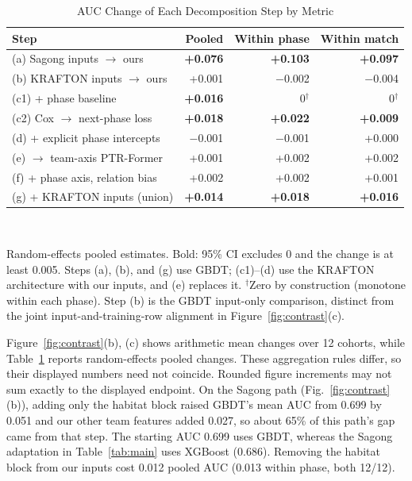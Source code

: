 \documentclass[sigconf,anonymous,nonacm]{acmart}
\begin{document}
\begin{table}[t]
\centering
\caption{AUC Change of Each Decomposition Step by Metric}
\label{tab:steps}
\footnotesize
\setlength{\tabcolsep}{3.5pt}
\begin{tabular}{lrrr}
\hline
Step & Pooled & Within phase & Within match \\
\hline
(a) Sagong inputs $\to$ ours & \textbf{+0.076} & \textbf{+0.103} & \textbf{+0.097} \\
(b) KRAFTON inputs $\to$ ours & +0.001 & $-$0.002 & $-$0.004 \\
(c1) + phase baseline & \textbf{+0.016} & 0$^\dagger$ & 0$^\dagger$ \\
(c2) Cox $\to$ next-phase loss & \textbf{+0.018} & \textbf{+0.022} & \textbf{+0.009} \\
(d) + explicit phase intercepts & $-$0.001 & $-$0.001 & +0.000 \\
(e) $\to$ team-axis PTR-Former & +0.001 & +0.002 & +0.002 \\
(f) + phase axis, relation bias & +0.002 & +0.002 & +0.001 \\
(g) + KRAFTON inputs (union) & \textbf{+0.014} & \textbf{+0.018} & \textbf{+0.016} \\
\hline
\end{tabular}
\\[2pt]
\parbox{\columnwidth}{\scriptsize Random-effects pooled estimates. Bold: 95\% CI excludes 0 and the change is at least 0.005. Steps (a), (b), and (g) use GBDT; (c1)--(d) use the KRAFTON architecture with our inputs, and (e) replaces it. $^\dagger$Zero by construction (monotone within each phase). Step (b) is the GBDT input-only comparison, distinct from the joint input-and-training-row alignment in Figure~\ref{fig:contrast}(c).}
\end{table}
Figure~\ref{fig:contrast}(b), (c) shows arithmetic mean changes over 12 cohorts, while Table~\ref{tab:steps} reports random-effects pooled changes. These aggregation rules differ, so their displayed numbers need not coincide. Rounded figure increments may not sum exactly to the displayed endpoint.
On the Sagong path (Fig.~\ref{fig:contrast}(b)), adding only the habitat block raised GBDT's mean AUC from 0.699 by 0.051 and our other team features added 0.027, so about 65\% of this path's gap came from that step. The starting AUC 0.699 uses GBDT, whereas the Sagong adaptation in Table~\ref{tab:main} uses XGBoost (0.686). Removing the habitat block from our inputs cost 0.012 pooled AUC (0.013 within phase, both 12/12).
\end{document}
